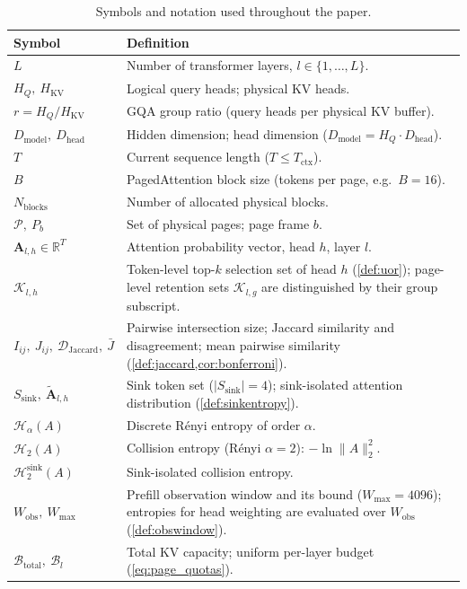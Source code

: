 \documentclass[final,5p,times,twocolumn]{elsarticle}
\theoremstyle{definition}
\theoremstyle{remark}
\newcommand{\HQ}{H_{Q}}
\newcommand{\HKV}{H_{\mathrm{KV}}}
\newcommand{\Dmodel}{D_{\mathrm{model}}}
\newcommand{\Dhead}{D_{\mathrm{head}}}
\newcommand{\Nblk}{N_{\mathrm{blocks}}}
\newcommand{\Attn}[2]{\mathbf{A}_{#1,#2}}
\newcommand{\Renyi}[2]{\mathcal{H}_{#1}\!\left(#2\right)}
\newcommand{\Collision}[1]{\mathcal{H}_{2}\!\left(#1\right)}
\newcommand{\CollisionSink}[1]{\mathcal{H}^{\mathrm{sink}}_{2}\!\left(#1\right)}
\newcommand{\PageSet}{\mathcal{P}}
\newcommand{\RetSet}[2]{\mathcal{K}_{#1,#2}}
\newcommand{\TokSet}[1]{\mathcal{K}_{l,#1}}
\newcommand{\Ssink}{S_{\mathrm{sink}}}
\begin{document}
\begin{table}[t]
\centering
\small
\caption{Symbols and notation used throughout the paper.}
\label{tab:notation}
\begin{tabularx}{\textwidth}{@{} l X @{}}
\toprule
\textbf{Symbol} & \textbf{Definition} \\
\midrule
 $L$ & Number of transformer layers, $l \in \{1,\dots,L\}$. \\
 $\HQ,\ \HKV$ & Logical query heads; physical KV heads. \\
 $r=\HQ/\HKV$ & GQA group ratio (query heads per physical KV buffer). \\
 $\Dmodel,\ \Dhead$ & Hidden dimension; head dimension
  ($\Dmodel = \HQ \cdot \Dhead$). \\
 $T$ & Current sequence length ($T \le T_{\mathrm{ctx}}$). \\
 $B$ & PagedAttention block size (tokens per page, e.g.\ $B=16$). \\
 $\Nblk$ & Number of allocated physical blocks. \\
 $\PageSet,\ P_b$ & Set of physical pages; page frame $b$. \\
 $\Attn{l}{h}\in\mathbb{R}^{T}$ & Attention probability vector, head $h$,
  layer $l$. \\
 $\TokSet{h}$ & Token-level top-$k$ selection set of head $h$   (\cref{def:uor}); page-level retention sets $\RetSet{l}{g}$ are
  distinguished by their group subscript. \\
 $I_{ij},\ J_{ij},\ \mathcal{D}_{\mathrm{Jaccard}},\ \bar{J}$ &
  Pairwise intersection size; Jaccard similarity and disagreement; mean
  pairwise similarity (\cref{def:jaccard,cor:bonferroni}). \\
 $\Ssink,\ \tilde{\mathbf{A}}_{l,h}$ & Sink token set ($|\Ssink|=4$);
  sink-isolated attention distribution (\cref{def:sinkentropy}). \\
 $\Renyi{\alpha}{A}$ & Discrete R\'enyi entropy of order $\alpha$. \\
 $\Collision{A}$ & Collision entropy (R\'enyi $\alpha{=}2$):
  $-\ln\|A\|_2^2$. \\
 $\CollisionSink{A}$ & Sink-isolated collision entropy. \\
 $W_{\mathrm{obs}},\ W_{\max}$ & Prefill observation window and its
  bound ($W_{\max}=4096$); entropies for head weighting are evaluated
  over $W_{\mathrm{obs}}$ (\cref{def:obswindow}). \\
 $\mathcal{B}_{\mathrm{total}},\ \mathcal{B}_l$ & Total KV capacity;
  uniform per-layer budget (\cref{eq:page_quotas}). \\

\end{tabularx}
\end{table}
\end{document}
